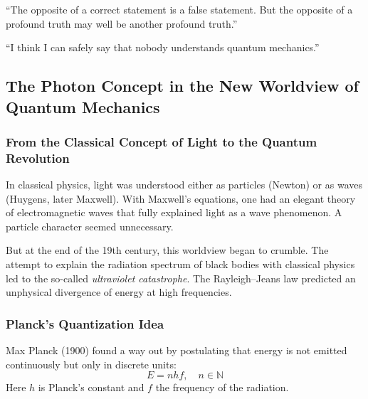 \begin{tcolorbox}[physikbox, title={Niels Bohr (1933)\cite{bohr1933}}]
	\label{box:bohr1933}
	“The opposite of a correct statement is a false statement. But the opposite of a profound truth may well be another profound truth.”\\
\end{tcolorbox}

\begin{tcolorbox}[physikbox, title={Richard P. Feynman (1965)\cite{feynman1965}}]
	\label{box:feynman1965}
	“I think I can safely say that nobody understands quantum mechanics.”\\
\end{tcolorbox}

\subsection{The Photon Concept in the New Worldview of Quantum Mechanics}

\subsubsection{From the Classical Concept of Light to the Quantum Revolution}

In classical physics, light was understood either as particles (Newton) or as waves (Huygens, later Maxwell). With Maxwell’s equations, one had an elegant theory of electromagnetic waves that fully explained light as a wave phenomenon. A particle character seemed unnecessary.

But at the end of the 19th century, this worldview began to crumble. The attempt to explain the radiation spectrum of black bodies with classical physics led to the so-called \emph{ultraviolet catastrophe}. The Rayleigh–Jeans law predicted an unphysical divergence of energy at high frequencies.

\subsubsection{Planck’s Quantization Idea}

Max Planck (1900) found a way out by postulating that energy is not emitted continuously but only in discrete units:
\begin{equation}
	E = n h f, \quad n \in \mathbb{N}
\end{equation}
Here $h$ is Planck’s constant and $f$ the frequency of the radiation.


